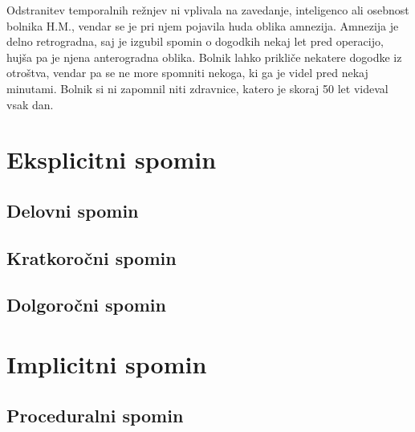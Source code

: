 \documentclass[10pt,a4paper]{article}
\begin{document}
Odstranitev temporalnih režnjev ni vplivala na zavedanje, inteligenco ali osebnost bolnika H.M., vendar se je pri njem pojavila huda oblika amnezija. Amnezija je delno retrogradna, saj je izgubil spomin o dogodkih nekaj let pred operacijo, hujša pa je njena anterogradna oblika. Bolnik lahko prikliče nekatere dogodke iz otroštva, vendar pa se ne more spomniti nekoga, ki ga je videl pred nekaj minutami. Bolnik si ni zapomnil niti zdravnice, katero je skoraj 50 let videval vsak dan. 


\section{Eksplicitni spomin}
\subsection{Delovni spomin}

\subsection{Kratkoročni spomin}

\subsection{Dolgoročni spomin}

\section{Implicitni spomin}
\subsection{Proceduralni spomin}


\section{}
\end{document}
